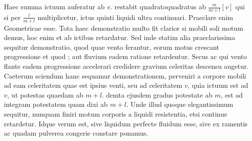 Haec summa ictuum auferatur ab $\displaystyle v.$
restabit quadratoquadratus ab $\displaystyle \frac{m}{m + l}[v]$
qui si per $\displaystyle \frac{l}{m + l}$ multiplicetur, ictus quinti liquidi 
ultra continuari. Praeclare enim 
Geometricae esse.
\pend
\pstart
Tota haec demonstratio multo fit clarior si mobili soli motum demus, hoc enim et ab ictibus retardatur. Sed inde statim alia praeclarissima sequitur demonstratio, quod quae vento 
ferantur, eorum motus crescant progressione 
et quod ;
aut fluvium eadem ratione retardentur. Secus ac  qui vento flante eadem progressione accelerari credidere 
gravium\protect{} celeritas descensu augetur. Caeterum sciendum 
hanc sequamur demonstrationem, 
perveniri a corpore mobili ad eam celeritatem quae est ipsius venti, seu ad celeritatem $\displaystyle v$, quia 
ictuum est ad $\displaystyle v$, ut potestas quaedam ab $\displaystyle m + l$. demta ejusdem gradus potestate ab $\displaystyle m$, est ad integram potestatem quam dixi ab $\displaystyle m + l$.
Unde illud quoque elegantissimum sequitur, nunquam finiri motum corporis a liquidi resistentia\protect{}, etsi continue retardetur. Idque verum est, sive liquidum perfecte fluidum esse, sive ex ramentis ac quadam pulverea congerie constare ponamus.
